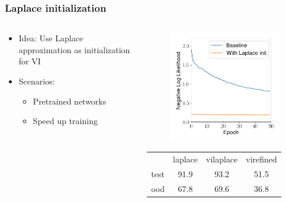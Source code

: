 \documentclass{beamer}
\begin{document}
        \begin{frame}
            \frametitle{Laplace initialization}
            \begin{columns}
                \begin{column}{0.5\textwidth}
                    \begin{itemize}
                        \item Idea: Use Laplace approximation as initialization for VI
                        \item Scenarios:
                            \begin{itemize}
                                \item Pretrained networks
                                \item Speed up training
                            \end{itemize}
                    \end{itemize}    
                \end{column}
                \begin{column}{0.5\textwidth}                    
                    \begin{figure}
                        \includegraphics[width=\textwidth]{images/Classification/LaplaceInit.png}
                    \end{figure}
                    \begin{tabular}{cccc}
                        &laplace & vilaplace & virefined \\
                        test & 91.9 & 93.2 & 51.5 \\
                        ood & 67.8 & 69.6 & 36.8
                    \end{tabular}
                \end{column}
            \end{columns}
        \end{frame}
        
\end{document}
